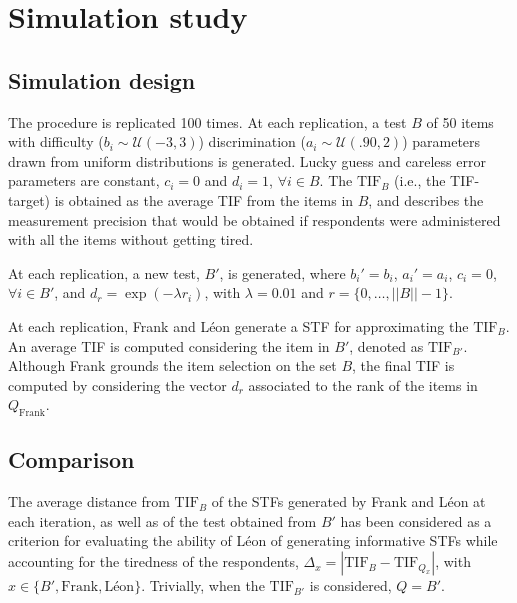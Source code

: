 \documentclass{svproc}
\begin{document}
\section{Simulation study}

\subsection{Simulation design}



The procedure is replicated 100 times. At each replication, a test $B$ of 50 items with difficulty ($b_i \sim \mathcal{U}(-3, 3)$) discrimination ($a_i \sim \mathcal{U}(.90, 2)$) parameters drawn from uniform distributions is generated. Lucky 
guess and careless error parameters are constant, $c_i = 0$ and $d_i = 1$, $\forall i \in B$.
The $\text{TIF}_B$ (i.e., the TIF-target) is obtained as the average TIF  from the items in $B$, and describes the measurement precision that would be obtained if respondents were administered with all the items without getting tired. 

At each replication, a new test, $B'$, is generated, where $b_i' = b_i$, $a_i' = a_i$, $c_i = 0$, $\forall i \in B'$, and $d_r = \exp(-\lambda r_i)$, with $\lambda = 0.01$ and $r = \{0, \ldots, ||B|| -1\}$.

At each replication, Frank and Léon generate a STF for approximating the $\text{TIF}_B$. An average TIF is computed considering the item in $B'$, denoted as $\text{TIF}_{B'}$.
Although Frank grounds the item selection on the set $B$, the final TIF is computed by considering the vector $d_r$ associated to the rank of the items in $Q_{\text{Frank}}$.
\normalcolor


\subsection{Comparison}

The average distance from $\text{TIF}_B$ of the STFs generated by Frank and Léon at each iteration, as well as of the test obtained from $B'$ has been considered as a criterion for evaluating the ability of Léon of generating informative STFs while accounting for the tiredness of the respondents, $\Delta_x = |\text{TIF}_B - \text{TIF}_{Q_x}|$, with $x \in \{B', \text{Frank}, \text{Léon}\}$.  Trivially, when the $\text{TIF}_{B'}$ is considered, $Q = B'$.
\end{document}
